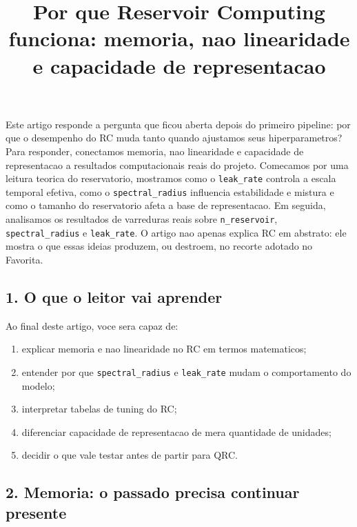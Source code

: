 \documentclass[12pt]{article}
\title{Por que Reservoir Computing funciona: memoria, nao linearidade e capacidade de representacao}
\author{}
\providecommand{\tightlist}{%
          \setlength{\itemsep}{0pt}\setlength{\parskip}{0pt}}
\begin{document}
        \maketitle

        \begin{resumo}
        Este artigo responde a pergunta que ficou aberta depois do primeiro pipeline: por que o desempenho do RC muda tanto quando ajustamos seus hiperparametros? Para responder, conectamos memoria, nao linearidade e capacidade de representacao a resultados computacionais reais do projeto. Comecamos por uma leitura teorica do reservatorio, mostramos como o \texttt{leak\_rate} controla a escala temporal efetiva, como o \texttt{spectral\_radius} influencia estabilidade e mistura e como o tamanho do reservatorio afeta a base de representacao. Em seguida, analisamos os resultados de varreduras reais sobre \texttt{n\_reservoir}, \texttt{spectral\_radius} e \texttt{leak\_rate}. O artigo nao apenas explica RC em abstrato: ele mostra o que essas ideias produzem, ou destroem, no recorte adotado no Favorita.
        \end{resumo}

        \subsection{1. O que o leitor vai aprender}\label{1-o-que-o-leitor-vai-aprender}

Ao final deste artigo, voce sera capaz de:

\begin{enumerate}
\def\labelenumi{\arabic{enumi}.}
\tightlist
\item
  explicar memoria e nao linearidade no RC em termos matematicos;
\item
  entender por que \texttt{spectral\_radius} e \texttt{leak\_rate} mudam o comportamento do modelo;
\item
  interpretar tabelas de tuning do RC;
\item
  diferenciar capacidade de representacao de mera quantidade de unidades;
\item
  decidir o que vale testar antes de partir para QRC.
\end{enumerate}

\subsection{2. Memoria: o passado precisa continuar presente}\label{2-memoria-o-passado-precisa-continuar-presente}
\end{document}
